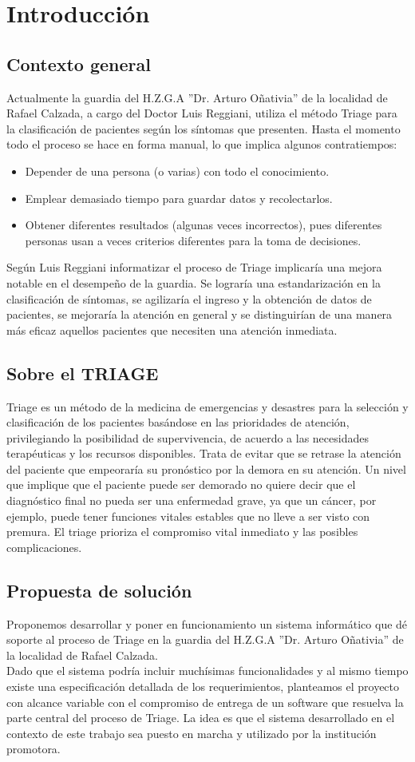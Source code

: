 \section{Introducción}
\subsection{Contexto general}
Actualmente la guardia del H.Z.G.A ''Dr. Arturo Oñativia'' de la localidad de Rafael Calzada, a cargo del Doctor Luis Reggiani, utiliza el método Triage \cite{Derlet} \cite{Manual} para la clasificación de pacientes según los síntomas que presenten. Hasta el momento todo el proceso se hace en forma manual, lo que implica algunos contratiempos:
\begin{itemize}
\item Depender de una persona (o varias) con todo el conocimiento.
\item Emplear demasiado tiempo para guardar datos y recolectarlos.
\item Obtener diferentes resultados (algunas veces incorrectos), pues diferentes personas usan a veces criterios diferentes para la toma de decisiones.
\end{itemize}
Según Luis Reggiani informatizar el proceso de Triage implicaría una mejora notable en el desempeño de la guardia. Se lograría una estandarización en la clasificación de síntomas, se agilizaría el ingreso y la obtención de datos de pacientes, se mejoraría la atención en general y se distinguirían de una manera más eficaz aquellos pacientes que necesiten una atención inmediata.
\subsection{Sobre el TRIAGE}
Triage es un método de la medicina de emergencias y desastres para la selección y clasificación de los pacientes basándose en las prioridades de atención, privilegiando la posibilidad de supervivencia, de acuerdo a las necesidades terapéuticas y los recursos disponibles. Trata de evitar que se retrase la atención del paciente que empeoraría su pronóstico por la demora en su atención. Un nivel que implique que el paciente puede ser demorado no quiere decir que el diagnóstico final no pueda ser una enfermedad grave, ya que un cáncer, por ejemplo, puede tener funciones vitales estables que no lleve a ser visto con premura. El triage prioriza el compromiso vital inmediato y las posibles complicaciones.
\subsection{Propuesta de solución}
Proponemos desarrollar y poner en funcionamiento un sistema informático que dé soporte al proceso de Triage en la guardia del H.Z.G.A ''Dr. Arturo Oñativia'' de la localidad de Rafael Calzada.\\
Dado que el sistema podría incluir muchísimas funcionalidades y al mismo tiempo existe una especificación detallada de los requerimientos, planteamos el proyecto con alcance variable con el compromiso de entrega de un software que resuelva la parte central del proceso de Triage. La idea es que el sistema desarrollado en el contexto de este trabajo sea puesto en marcha y utilizado por la institución promotora.
